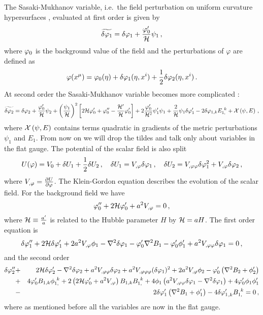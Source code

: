 The Sasaki-Mukhanov variable, i.e.\ the field perturbation on uniform curvature
hypersurfaces \cite{Sasaki:1986hm,Mukhanov:1988jd}, evaluated at first order is
given by
%  
\begin{equation}
\label{eq:Q1I-num}
\widetilde{\delta\varphi_{1}}=\delta\varphi_{1}+\frac{\varphi_{0}'}{\mathcal{H}}\psi_1\,, 
\end{equation}
% 
where $\varphi_0$ is the background value of the field and the perturbations of
$\varphi$ are defined as
%  
\begin{equation}
 \varphi(x^\mu) = \varphi_0(\eta) + \delta\varphi_{1}(\eta, x^i) + \frac{1}{2}\delta\varphi_{2}(\eta, x^i)
\,.
\end{equation}
% 
At second order the Sasaki-Mukhanov variable becomes more complicated
\cite{Malik:2005cy,Malik:2003mv}:
% 
\begin{equation}
\label{eq:Q2I-num}
\widetilde{\delta\varphi_{2}}=\delta\varphi_{2}+\frac{\varphi_{0}'}{\mathcal{H}}\psi_2
+\left(\frac{\psi_1}{\mathcal{H}}\right)^2\left[
2\mathcal{H}\varphi_{0}'+\varphi_{0}''-\frac{\mathcal{H}'}{\mathcal{H}}\varphi_{0}'\right]
+2\frac{\varphi_{0}'}{\mathcal{H}^2}\psi_1'\psi_1+\frac{2}{\mathcal{H}}\psi_1\delta\varphi_{1}'
-2\delta\varphi_{1,k}E_{1,}^{~k}
+{\cal{X}}\left(\psi,E\right)\,,
\end{equation}
% 
where ${\cal{X}}\left(\psi,E\right)$ contains terms quadratic in
gradients of the metric perturbations $\psi_1$ and $E_1$. From now on we will
drop the tildes and talk only about variables in the flat gauge.
The potential of the scalar field is also split
% 
\begin{equation}
 U(\varphi) = V_{0} + \delta U_{1} + \frac{1}{2}\delta U _{2}\,,\quad
 \delta U_{1} = V_{,\varphi} \delta\varphi_{1} \,,\quad
 \delta U_{2} = V_{,\varphi\varphi} \delta\varphi_{1}^2 + V_{,\varphi}\delta\varphi_{2} \,,
\end{equation}
% 
where $V_{,\varphi} = \frac{\partial U}{\partial \varphi}$.
The Klein-Gordon equation describes the evolution of the scalar field. For the
background field we have
%
\begin{equation}
\label{eq:KGback-num}
\varphi_{0}''+2\mathcal{H}\varphi_{0}'+a^2 V_{,\varphi} = 0\,,   
\end{equation}
%
where $\mathcal{H}\equiv\frac{a'}{a}$ is related to the Hubble parameter $H$ by $\mathcal{H}=aH$.
% 
The first order equation is
%
\begin{equation}
\label{eq:KGflatsingle-num}
\delta\varphi_{1}''+2\mathcal{H}\delta\varphi_{1}'+2a^2 V_{,\varphi} \phi_1
-\nabla^2\delta\varphi_{1}-\varphi_{0}'\nabla^2 B_1
-\varphi_{0}'\phi'_1 + a^2 V_{,\varphi\varphi} \delta\varphi_{1}
=0\,,
\end{equation}
%
and the second order
%
\begin{eqnarray}
\label{eq:KG2flatsingle-num}
\dvp2''&+&2\H\dvp2'-\nabla^2\dvp2+a^2 \Upp \dvp2
+a^2 \Uppp (\dvp1)^2 +2a^2 \Uphi \phi_2
-\vp_{0}'\left(\nabla^2 B_2+\phi_2'\right)\nonumber\\
%
&+&4\vp_{0}' B_{1,k}\phi_{1,}^{~k}
+2\left(2\H\vp_{0}'+a^2 \Uphi\right) B_{1,k}B_{1,}^{~k}
+4\phi_1\left(a^2 \Upp \dvp1-\nabla^2\dvp1\right)
+4\vp_{0}'\phi_1\phi_1'\nonumber\\
%
&-&2\dvp1'\left(\nabla^2 B_1+\phi_1'\right)-4{\dvp1'}_{,k}B_{1,}^{~k}
=0\,,
\end{eqnarray}
% 
where as mentioned before all the variables are now in the flat gauge.


